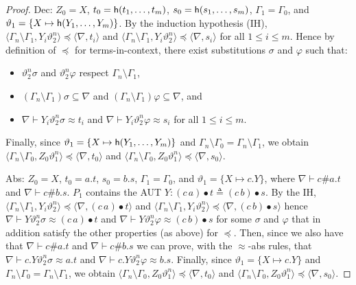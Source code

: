 \documentclass[11pt,a4paper]{amsart}
\theoremstyle{definition}
\newcommand{\swap}[2]{\ensuremath{(#1\, #2)}}
\newcommand{\permef}{\bullet}
\newcommand\nomh{{\sf h}}
\newcommand{\np}[2]{\langle #1, \allowbreak #2\rangle}
\begin{document}
\begin{proof}
{\sf Dec:} $Z_0=X$, $t_0=\nomh(t_1,\ldots,t_m)$,
$s_0=\nomh(s_1,\ldots,s_m)$, $\Gamma_1=\Gamma_0$, and
$\vartheta_1=\{X\mapsto \nomh(Y_1,\ldots,Y_m)\}$. By the induction
hypothesis (IH), $\np{\Gamma_n\setminus
  \Gamma_1}{Y_i\vartheta_2^n}\preceq \np{\nabla}{t_i}$ and
$\np{\Gamma_n\setminus \Gamma_1}{Y_i\vartheta_2^n}\preceq
\np{\nabla}{s_i}$ for all $1\le i \le m$.  
Hence by definition of $\preceq$ for terms-in-context,
  there exist substitutions $\sigma$ and $\varphi$ such that:
\begin{itemize}
\item $\vartheta_2^n\sigma$  and $\vartheta_2^n\varphi$ respect
  $\Gamma_n\setminus \Gamma_1$,
\item  $(\Gamma_n\setminus
  \Gamma_1)\sigma\subseteq\nabla$ and $(\Gamma_n\setminus
  \Gamma_1)\varphi\subseteq\nabla$, and
\item  $\nabla \vdash
  Y_i\vartheta_2^n\sigma \approx t_i$ and $\nabla \vdash
  Y_i\vartheta_2^n\varphi \approx s_i$ for all $1\le i \le m$.
\end{itemize}
 Finally, since $\vartheta_1=\{X\mapsto \nomh(Y_1,\ldots,Y_m)\}$ and 
$\Gamma_n\setminus \Gamma_0=\Gamma_n\setminus \Gamma_1$, we obtain
$\np{\Gamma_n\setminus \Gamma_0}{Z_0\vartheta_1^n}\preceq
\np{\nabla}{t_0}$ and $\np{\Gamma_n\setminus
  \Gamma_0}{Z_0\vartheta_1^n}\preceq \np{\nabla}{s_0}$. \vspace{0.3cm}


{\sf Abs:} $Z_0=X$, $t_0= a.t$, $s_0=b.s$, $\Gamma_1=\Gamma_0$, and
$\vartheta_1=\{X\mapsto c.Y\}$, where $ \nabla \vdash c\# a.t$ and $
\nabla \vdash c\# b.s$. $P_1$ contains the AUT $Y: \swap{c}{a}\permef t
\triangleq \swap{c}{b}\permef s$. By the IH, 
$\np{\Gamma_n\setminus
  \Gamma_1}{Y_i\vartheta_2^n}\preceq \np{\nabla}{\swap{c}{a}\permef t}$ and
$\np{\Gamma_n\setminus \Gamma_1}{Y_i\vartheta_2^n}\preceq
\np{\nabla}{\swap{c}{b}\permef s}$
 hence $\nabla \vdash
Y\vartheta_2^n\sigma \approx \swap{c}{a}\permef t$ and $\nabla \vdash
Y\vartheta_2^n\varphi \approx \swap{c}{b}\permef s$ for some $\sigma$ and
$\varphi$ that in addition satisfy the other properties (as above) for $\preceq$. Then, since we also have that $ \nabla \vdash c\# a.t$ and $
\nabla \vdash c\# b.s$ we can prove, with the $\approx$-abs rules, that $\nabla \vdash c.Y\vartheta_2^n\sigma \approx a.t$ and $\nabla
\vdash c.Y\vartheta_2^n\varphi \approx b.s$.
 Finally, since $\vartheta_1=\{X\mapsto c.Y\}$ and
$\Gamma_n\setminus \Gamma_0=\Gamma_n\setminus \Gamma_1$, we obtain
$\np{\Gamma_n\setminus \Gamma_0}{Z_0\vartheta_1^n}\preceq
\np{\nabla}{t_0}$ and $\np{\Gamma_n\setminus
  \Gamma_0}{Z_0\vartheta_1^n}\preceq \np{\nabla}{s_0}$.\vspace{0.3cm}



\end{proof}
\end{document}
